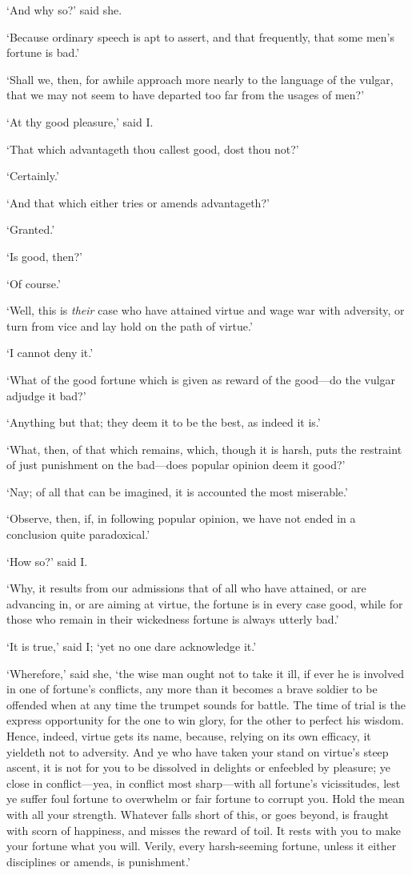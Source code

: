 \documentclass[11pt]{book}
\begin{document}
`And why so?' said she.

`Because ordinary speech is apt to assert, and that frequently, that
some men's fortune is bad.'

`Shall we, then, for awhile approach more nearly to the language of the
vulgar, that we may not seem to have departed too far from the usages of
men?'

`At thy good pleasure,' said I.

`That which advantageth thou callest good, dost thou not?'

`Certainly.'

`And that which either tries or amends advantageth?'

`Granted.'

`Is good, then?'

`Of course.'

`Well, this is \emph{their} case who have attained virtue and wage war with
adversity, or turn from vice and lay hold on the path of virtue.'

`I cannot deny it.'

`What of the good fortune which is given as reward of the good---do the
vulgar adjudge it bad?'

`Anything but that; they deem it to be the best, as indeed it is.'

`What, then, of that which remains, which, though it is harsh, puts the
restraint of just punishment on the bad---does popular opinion deem it
good?'

`Nay; of all that can be imagined, it is accounted the most miserable.'

`Observe, then, if, in following popular opinion, we have not ended in a
conclusion quite paradoxical.'

`How so?' said I.

`Why, it results from our admissions that of all who have attained, or
are advancing in, or are aiming at virtue, the fortune is in every case
good, while for those who remain in their wickedness fortune is always
utterly bad.'

`It is true,' said I; `yet no one dare acknowledge it.'

`Wherefore,' said she, `the wise man ought not to take it ill, if ever
he is involved in one of fortune's conflicts, any more than it becomes a
brave soldier to be offended when at any time the trumpet sounds for
battle. The time of trial is the express opportunity for the one to win
glory, for the other to perfect his wisdom. Hence, indeed, virtue gets
its name, because, relying on its own efficacy, it yieldeth not to
adversity. And ye who have taken your stand on virtue's steep ascent,
it is not for you to be dissolved in delights or enfeebled by pleasure;
ye close in conflict---yea, in conflict most sharp---with all fortune's
vicissitudes, lest ye suffer foul fortune to overwhelm or fair fortune
to corrupt you. Hold the mean with all your strength. Whatever falls
short of this, or goes beyond, is fraught with scorn of happiness, and
misses the reward of toil. It rests with you to make your fortune what
you will. Verily, every harsh-seeming fortune, unless it either
disciplines or amends, is punishment.'
\end{document}
